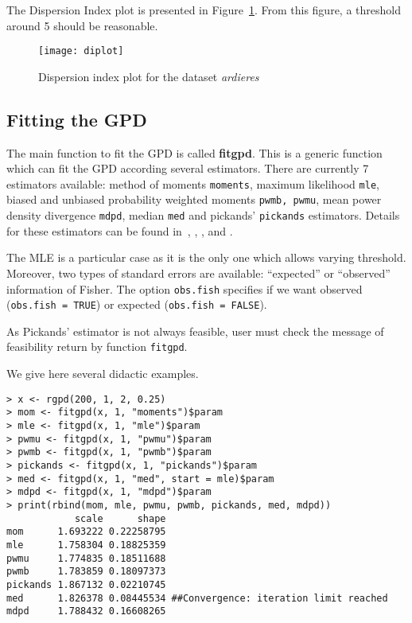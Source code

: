 \documentclass[11pt,a4paper]{article}
\numberwithin{equation}{section}
\begin{document}
The Dispersion Index plot is presented in
Figure~\ref{fig:diplot}. From this figure, a threshold around 5 should
be reasonable.

\begin{figure}
  \centering
  \texttt{[image: diplot]}
  \caption{Dispersion index plot for the dataset \emph{ardieres}}
  \label{fig:diplot}
\end{figure}

\subsection{Fitting the GPD}
\label{subsec:fitGPD}

The main function to fit the GPD is called \textbf{fitgpd}. This is a
generic function which can fit the GPD according several
estimators. There are currently 7 estimators available: method of
moments \verb|moments|, maximum likelihood \verb|mle|, biased and
unbiased probability weighted moments \verb|pwmb, pwmu|, mean power
density divergence \verb|mdpd|, median \verb|med| and pickands'
\verb|pickands| estimators. Details for these estimators can be found
in~\citep{Coles2001}, \citep{Hosking1987}, \citep{Juarez2004},
\citep{Peng2001} and \citep{Pickands1975}.

The MLE is a particular case as it is the only one which allows
varying threshold. Moreover, two types of standard errors are
available: ``expected'' or ``observed'' information of Fisher. The
option \verb|obs.fish| specifies if we want observed
(\verb|obs.fish = TRUE|) or expected (\verb|obs.fish = FALSE|).

As Pickands' estimator is not always feasible, user must check the
message of feasibility return by function \verb+fitgpd+.

We give here several didactic examples.
\begin{verbatim}
> x <- rgpd(200, 1, 2, 0.25)                             
> mom <- fitgpd(x, 1, "moments")$param                        
> mle <- fitgpd(x, 1, "mle")$param                       
> pwmu <- fitgpd(x, 1, "pwmu")$param                     
> pwmb <- fitgpd(x, 1, "pwmb")$param                     
> pickands <- fitgpd(x, 1, "pickands")$param             
> med <- fitgpd(x, 1, "med", start = mle)$param          
> mdpd <- fitgpd(x, 1, "mdpd")$param                     
> print(rbind(mom, mle, pwmu, pwmb, pickands, med, mdpd))
            scale      shape
mom      1.693222 0.22258795
mle      1.758304 0.18825359
pwmu     1.774835 0.18511688
pwmb     1.783859 0.18097373
pickands 1.867132 0.02210745
med      1.826378 0.08445534 ##Convergence: iteration limit reached
mdpd     1.788432 0.16608265
\end{verbatim}
\end{document}
